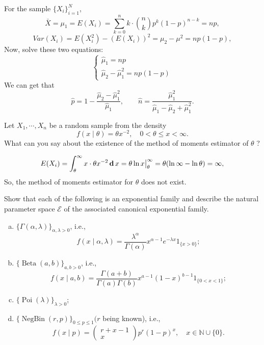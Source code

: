 \begin{solution}
    For the sample \(\{X_i\}_{i=1}^N\), 
    \[
        \bar{X}=\mu_1=E(X_i)=\sum_{k=0}^nk\cdot \binom{n}{k}p^k(1-p)^{n-k}=np, 
    \]
    \[
        Var(X_i)=E(X_i^2)-(E(X_i))^2=\mu_2-\mu^2=np(1-p), 
    \]
    Now, solve these two equations: 
    \[
        \left\{\begin{array}{l}
            \hat{\mu}_1=np\\
            \hat{\mu}_2-\hat{\mu}_1^2=np(1-p)
        \end{array}\right.
    \]
    We can get that
    \[
        \hat{p}=1-\frac{\hat{\mu}_2-\hat{\mu}_1^2}{\hat{\mu}_1},\qquad\hat{n}=\frac{\hat{\mu}_1^2}{\hat{\mu}_1-\hat{\mu}_2+\hat{\mu}_1^2}. 
    \]
\end{solution}

\begin{exercise}
    Let \(X_{1}, \cdots, X_{n}\) be a random sample from the density
    \[
    f(x \mid \theta)=\theta x^{-2}, \quad 0<\theta \leqslant x<\infty .
    \]
    What can you say about the existence of the method of moments estimator of \(\theta\) ?
\end{exercise}

\begin{solution}
    \[
        E(X_i)=\int_{\theta}^\infty x\cdot \theta x^{-2}\,\mathbf{d}\, x=\theta \ln x \big|_\theta^\infty=\theta(\ln\infty-\ln\theta)=\infty, 
    \]
    So, the method of moments estimator for \(\theta\) does not exist. 
\end{solution}

\begin{exercise}
    Show that each of the following is an exponential family and describe the natural parameter space \(\mathcal{E}\) of the associated canonical exponential family.
    \begin{enumerate}[(a)]
        \item \(\{\Gamma(\alpha, \lambda)\}_{\alpha, \lambda>0}\), i.e.,
        \[
        f(x \mid \alpha, \lambda)=\frac{\lambda^{\alpha}}{\Gamma(\alpha)} x^{\alpha-1} e^{-\lambda x} 1_{\{x>0\}} ;
        \]
        \item \(\{\operatorname{Beta}(a, b)\}_{a, b>0}\), i.e.,
        \[
        f(x \mid a, b)=\frac{\Gamma(a+b)}{\Gamma(a) \Gamma(b)} x^{a-1}(1-x)^{b-1} 1_{\{0<x<1\}} ;
        \]
        \item \(\{\operatorname{Poi}(\lambda)\}_{\lambda>0}\);
        \item \(\{\operatorname{NegBin}(r, p)\}_{0 \leqslant p \leqslant 1}(r\) being known), i.e.,
        \[
        f(x \mid p)=\left(\begin{array}{c}
        r+x-1 \\
        x
        \end{array}\right) p^{r}(1-p)^{x}, \quad x \in \mathbb{N} \cup\{0\} .
        \]
    \end{enumerate}
\end{exercise}

